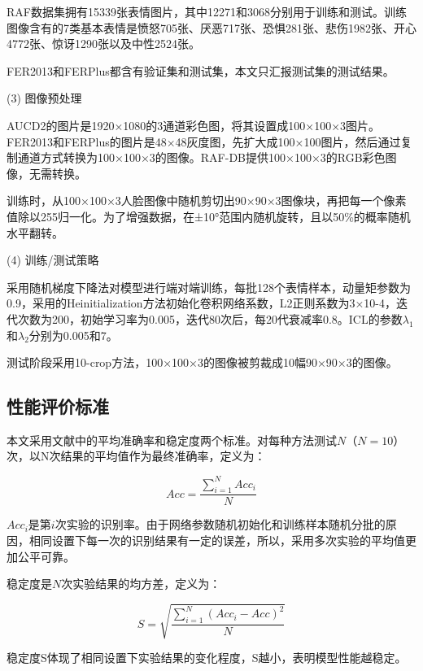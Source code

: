 RAF数据集拥有15339张表情图片，其中12271和3068分别用于训练和测试。训练图像含有的7类基本表情是愤怒705张、厌恶717张、恐惧281张、悲伤1982张、开心4772张、惊讶1290张以及中性2524张。

FER2013和FERPlus都含有验证集和测试集，本文只汇报测试集的测试结果。

(3)	图像预处理

AUCD2的图片是1920×1080的3通道彩色图，将其设置成100×100×3图片。FER2013和FERPlus的图片是48×48灰度图，先扩大成100×100图片，然后通过复制通道方式转换为100×100×3的图像。RAF-DB提供100×100×3的RGB彩色图像，无需转换。

训练时，从100×100×3人脸图像中随机剪切出90×90×3图像块，再把每一个像素值除以255归一化。为了增强数据，在±10°范围内随机旋转，且以50\%的概率随机水平翻转。

(4)	训练/测试策略

采用随机梯度下降法对模型进行端对端训练，每批128个表情样本，动量矩参数为0.9，采用的Heinitialization方法初始化卷积网络系数，L2正则系数为3×10-4，迭代次数为200，初始学习率为0.005，迭代80次后，每20代衰减率0.8。ICL的参数$\lambda_1$和$\lambda_2$分别为0.005和7。

测试阶段采用10-crop方法，100×100×3的图像被剪裁成10幅90×90×3的图像。



\subsection{性能评价标准}

本文采用文献\cite{66}中的平均准确率和稳定度两个标准。对每种方法测试$N（N=10）$次，以N次结果的平均值作为最终准确率，定义为：

\begin{equation}\label{公式4-12}
	Acc=\frac{\sum_{i=1}^{N}{Acc}_i}{N}
\end{equation}

${Acc}_i$是第$i$次实验的识别率。由于网络参数随机初始化和训练样本随机分批的原因，相同设置下每一次的识别结果有一定的误差，所以，采用多次实验的平均值更加公平可靠。

稳定度是$N$次实验结果的均方差，定义为：

\begin{equation}\label{公式4-13}
	S=\sqrt{\frac{\sum_{i=1}^{N}\left(Acc_i-Acc\right)^2}{N}}
\end{equation}

稳定度S体现了相同设置下实验结果的变化程度，S越小，表明模型性能越稳定。

